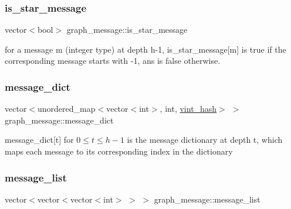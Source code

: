 \mbox{\label{classgraph__message_a55ff5531a0043106369e84a7bc45e22d}} 
\subsubsection{\texorpdfstring{is\+\_\+star\+\_\+message}{is\_star\_message}}
{\footnotesize\ttfamily vector$<$bool$>$ graph\+\_\+message\+::is\+\_\+star\+\_\+message}



for a message m (integer type) at depth h-\/1, is\+\_\+star\+\_\+message\mbox{[}m\mbox{]} is true if the corresponding message starts with -\/1, ans is false otherwise. 

\mbox{\label{classgraph__message_ab54d89b122c2b1322da0d5db2043fb84}} 
\subsubsection{\texorpdfstring{message\+\_\+dict}{message\_dict}}
{\footnotesize\ttfamily vector$<$unordered\+\_\+map$<$vector$<$int$>$, int, \hyperlink{structvint__hash}{vint\+\_\+hash}$>$ $>$ graph\+\_\+message\+::message\+\_\+dict}



message\+\_\+dict\mbox{[}t\mbox{]} for $0 \leq t \leq h-1$ is the message dictionary at depth t, which maps each message to its corresponding index in the dictionary 

\mbox{\label{classgraph__message_aa17fdb629b423343edfafa97252763ef}} 
\subsubsection{\texorpdfstring{message\+\_\+list}{message\_list}}
{\footnotesize\ttfamily vector$<$vector$<$vector$<$int$>$ $>$ $>$ graph\+\_\+message\+::message\+\_\+list}



